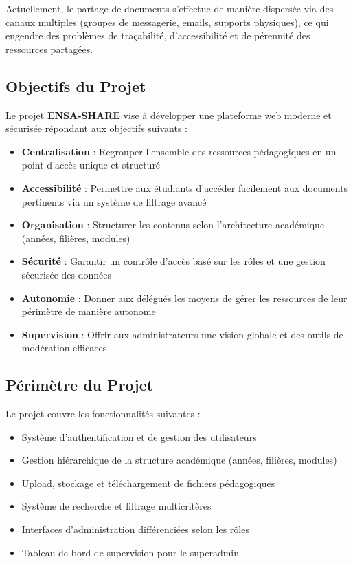 \documentclass[12pt,a4paper]{article}
\begin{document}
Actuellement, le partage de documents s'effectue de manière dispersée via des canaux multiples (groupes de messagerie, emails, supports physiques), ce qui engendre des problèmes de traçabilité, d'accessibilité et de pérennité des ressources partagées.

\subsection{Objectifs du Projet}

Le projet \textbf{ENSA-SHARE} vise à développer une plateforme web moderne et sécurisée répondant aux objectifs suivants :

\begin{itemize}[leftmargin=*]
    \item \textbf{Centralisation} : Regrouper l'ensemble des ressources pédagogiques en un point d'accès unique et structuré
    \item \textbf{Accessibilité} : Permettre aux étudiants d'accéder facilement aux documents pertinents via un système de filtrage avancé
    \item \textbf{Organisation} : Structurer les contenus selon l'architecture académique (années, filières, modules)
    \item \textbf{Sécurité} : Garantir un contrôle d'accès basé sur les rôles et une gestion sécurisée des données
    \item \textbf{Autonomie} : Donner aux délégués les moyens de gérer les ressources de leur périmètre de manière autonome
    \item \textbf{Supervision} : Offrir aux administrateurs une vision globale et des outils de modération efficaces
\end{itemize}

\subsection{Périmètre du Projet}

Le projet couvre les fonctionnalités suivantes :
\begin{itemize}[leftmargin=*]
    \item Système d'authentification et de gestion des utilisateurs
    \item Gestion hiérarchique de la structure académique (années, filières, modules)
    \item Upload, stockage et téléchargement de fichiers pédagogiques
    \item Système de recherche et filtrage multicritères
    \item Interfaces d'administration différenciées selon les rôles
    \item Tableau de bord de supervision pour le superadmin
\end{itemize}
\end{document}
